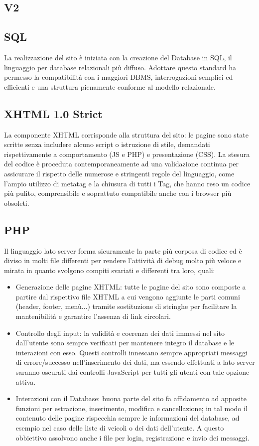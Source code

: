 \subsection{V2}

\subsection{SQL}
La realizzazione del sito è iniziata con la creazione del Database in SQL, il linguaggio per database relazionali più diffuso. Adottare questo standard ha permesso la compatibilità con i maggiori DBMS, interrogazioni semplici ed efficienti e una struttura pienamente conforme al modello relazionale.

\subsection{XHTML 1.0 Strict}
La componente XHTML corrisponde alla struttura del sito: le pagine sono state scritte senza includere alcuno script o istruzione di stile, demandati rispettivamente a comportamento (JS e PHP) e presentazione (CSS). La stesura del codice è proceduta contemporaneamente ad una validazione continua
per assicurare il rispetto delle numerose e stringenti regole del linguaggio, come l'ampio utilizzo di metatag e la chiusura di tutti i Tag, che hanno reso un codice più pulito, comprensibile e soprattuto compatibile anche con i browser più obsoleti.

\subsection{PHP}
Il linguaggio lato server forma sicuramente la parte più corposa di codice ed è diviso in molti file differenti per rendere l’attività di debug molto più veloce e mirata in quanto svolgono compiti svariati e differenti tra loro, quali:
\begin{itemize}
 \item Generazione delle pagine XHTML: tutte le pagine del sito sono composte a partire dal rispettivo file XHTML a cui vengono aggiunte le parti comuni (header, footer, menù...) tramite sostituzione di stringhe per facilitare la mantenibilità e garantire l'assenza di link circolari.
 \item Controllo degli input: la validità e coerenza dei dati immessi nel sito dall'utente sono sempre verificati per mantenere integro il database e le interazioni con esso. Questi controlli innescano sempre appropriati messaggi di errore/successo nell'inserimento dei dati, ma essendo effettuati a lato server saranno oscurati dai controlli JavaScript per tutti gli utenti con tale opzione attiva.
 \item Interazioni con il Database: buona parte del sito fa affidamento ad apposite funzioni per estrazione, inserimento, modifica e cancellazione; in tal modo il contenuto delle pagine rispecchia sempre le informazioni del database, ad esempio nel caso delle liste di veicoli o dei dati dell'utente. A questo obbiettivo assolvono anche i file per login, registrazione e invio dei messaggi.
\end{itemize}


